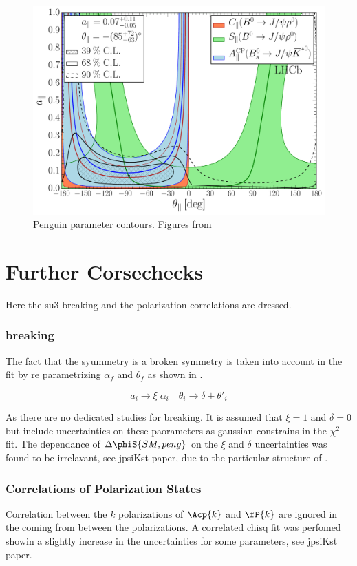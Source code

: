 \begin{figure}[h]
\begin{center}
  \includegraphics[trim=0.0cm 0.0cm 0.0cm 0.0cm, clip=true,scale=0.33]{Figures/Chapter5/Penguin_Contribution_Ang_vs_Abs_allB2VV_Para.pdf}
  \caption{Penguin parameter contours. Figures from~\cite{DeBruyn-thesis}}
  \label{pengPlot_para}
\end{center}
\end{figure}

\section{Further Corsechecks}
Here the su3 breaking and the polarization correlations are dressed.

\subsubsection{\grpsuthree breaking}
\label{su3_breaking}

The fact that the \grpsuthree syummetry is a broken symmetry is taken into account in the fit by re parametrizing
$\alpha_f$ and $\theta_f$ as shown in .

\begin{equation}
a_i \to \xi \; \alpha_i \quad \theta_i \to \delta + \theta'_i
\label{su3_breaking}
\end{equation}

As there are no dedicated studies for \grpsuthree breaking. It is assumed that $\xi=1$ and $\delta=0$ but include uncertainties
on these paorameters as gaussian constrains in the $\chi^2$ fit. The dependance of $\Delta\phiS{SM,peng}$ on the $\xi$ and $\delta$
uncertainties was found to be irrelavant, {\color{red} see jpsiKst paper}, due to the particular structure of .

\subsubsection{Correlations of Polarization States}
Correlation between the $k$ polarizations of $\Acp{k}$ and $\fP{k}$ are ignored in the coming from between the polarizations.
A correlated chisq fit was perfomed showin a slightly increase in the uncertainties for some parameters, see jpsiKst paper.
